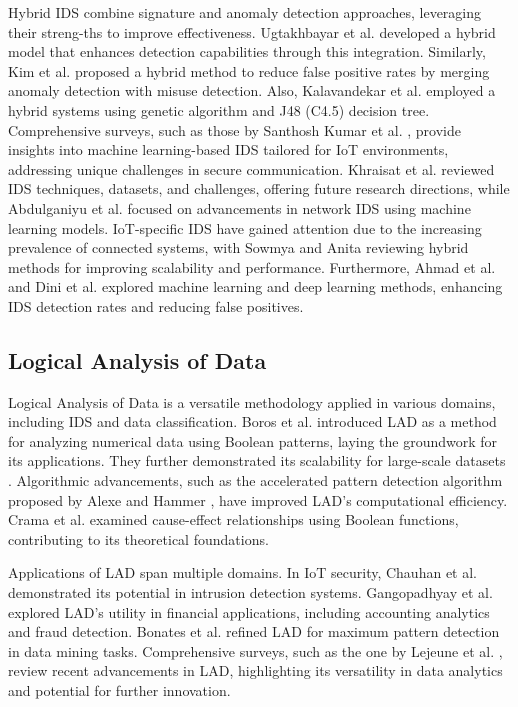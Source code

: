 \documentclass[pdflatex,sn-mathphys-num]{sn-jnl}%
\theoremstyle{thmstyleone}%
\theoremstyle{thmstyletwo}%
\theoremstyle{thmstylethree}%
\begin{document}
Hybrid IDS combine signature and anomaly detection approaches, leveraging their streng-ths to improve effectiveness. Ugtakhbayar et al. \cite{IDS6} developed a hybrid model that enhances detection capabilities through this integration. Similarly, Kim et al. \cite{IDS8} proposed a hybrid method to reduce false positive rates by merging anomaly detection with misuse detection. Also, Kalavandekar et al. \cite{IDS10} employed a hybrid systems using genetic algorithm and J48 (C4.5) decision tree. Comprehensive surveys, such as those by Santhosh Kumar et al. \cite{IDS2}, provide insights into machine learning-based IDS tailored for IoT environments, addressing unique challenges in secure communication. Khraisat et al. \cite{IDS19} reviewed IDS techniques, datasets, and challenges, offering future research directions, while Abdulganiyu et al. \cite{IDS9} focused on advancements in network IDS using machine learning models. IoT-specific IDS have gained attention due to the increasing prevalence of connected systems, with Sowmya and Anita \cite{IDS5} reviewing hybrid methods for improving scalability and performance. Furthermore, Ahmad et al. \cite{IDS16} and Dini et al. \cite{IDS17} explored machine learning and deep learning methods, enhancing IDS detection rates and reducing false positives.

\subsection{Logical Analysis of Data}
Logical Analysis of Data is a versatile methodology applied in various domains, including IDS and data classification. Boros et al. \cite{LAD1} introduced LAD as a method for analyzing numerical data using Boolean patterns, laying the groundwork for its applications. They further demonstrated its scalability for large-scale datasets \cite{LAD2}. Algorithmic advancements, such as the accelerated pattern detection algorithm proposed by Alexe and Hammer \cite{LAD5}, have improved LAD's computational efficiency. Crama et al. \cite{LAD6} examined cause-effect relationships using Boolean functions, contributing to its theoretical foundations.

Applications of LAD span multiple domains. In IoT security, Chauhan et al. \cite{LAD7} demonstrated its potential in intrusion detection systems. Gangopadhyay et al. \cite{LAD8} explored LAD's utility in financial applications, including accounting analytics and fraud detection. Bonates et al. \cite{LAD9} refined LAD for maximum pattern detection in data mining tasks. Comprehensive surveys, such as the one by Lejeune et al. \cite{LAD4}, review recent advancements in LAD, highlighting its versatility in data analytics and potential for further innovation.
\end{document}
